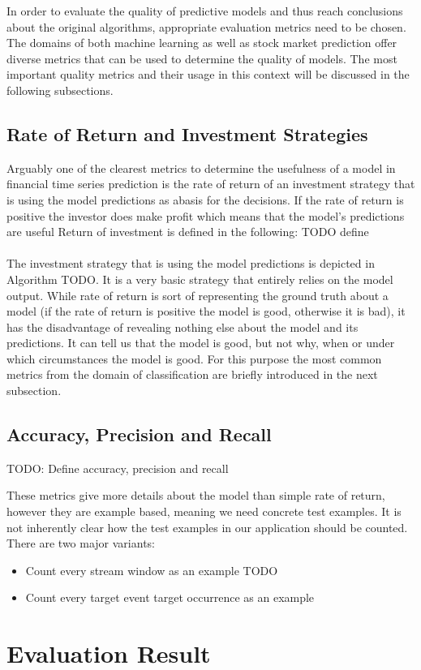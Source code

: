 In order to evaluate the quality of predictive models and thus reach conclusions about the original algorithms, appropriate evaluation metrics need to be chosen. The domains of both machine learning as well as stock market prediction offer diverse metrics that can be used to determine the quality of models. The most important quality metrics and their usage in this context will be discussed in the following subsections.

\subsection{Rate of Return and Investment Strategies}
Arguably one of the clearest metrics to determine the usefulness of a model in financial time series prediction is the rate of return of an investment strategy that is using the model predictions as abasis for the decisions. If the rate of return is positive the investor does make profit which means that the model's predictions are useful Return of investment is defined in the following: TODO define
\\
\\
The investment strategy that is using the model predictions is depicted in Algorithm TODO. It is a very basic strategy that entirely relies on the model output. While rate of return is sort of representing the ground truth about a model (if the rate of return is positive the model is good, otherwise it is bad), it has the disadvantage of revealing nothing else about the model and its predictions. It can tell us that the model is good, but not why, when or under which circumstances the model is good. For this purpose the most common metrics from the domain of classification are briefly introduced in the next subsection.

\subsection{Accuracy, Precision and Recall}
TODO: Define accuracy, precision and recall

These metrics give more details about the model than simple rate of return, however they are example based, meaning we need concrete test examples. It is not inherently clear how the test examples in our application should be counted. There are two major variants:

\begin{itemize}
	\item Count every stream window as an example TODO
	\item Count every target event target occurrence as an example
\end{itemize}

\section{Evaluation Result}
\label{sec_evaluationResults}

